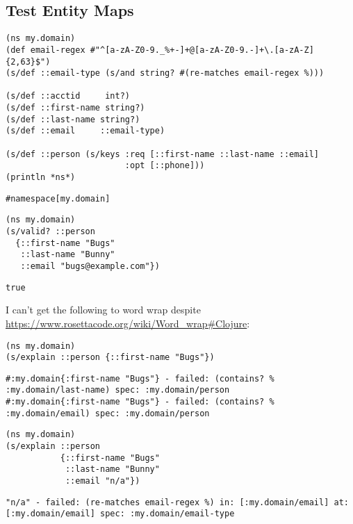 \documentclass[10pt,oneside,x11names]{article}
\begin{document}
\subsection{Test Entity Maps}
\label{sec:orgf1d3d4b}

\begin{verbatim}
(ns my.domain)
(def email-regex #"^[a-zA-Z0-9._%+-]+@[a-zA-Z0-9.-]+\.[a-zA-Z]{2,63}$")
(s/def ::email-type (s/and string? #(re-matches email-regex %)))

(s/def ::acctid     int?)
(s/def ::first-name string?)
(s/def ::last-name string?)
(s/def ::email     ::email-type)

(s/def ::person (s/keys :req [::first-name ::last-name ::email]
                        :opt [::phone]))
(println *ns*)
\end{verbatim}

\begin{verbatim}
#namespace[my.domain]
\end{verbatim}


\begin{verbatim}
(ns my.domain)
(s/valid? ::person
  {::first-name "Bugs"
   ::last-name "Bunny"
   ::email "bugs@example.com"})
\end{verbatim}

\begin{verbatim}
true
\end{verbatim}


I can't get the following to word wrap despite
\url{https://www.rosettacode.org/wiki/Word\_wrap\#Clojure}:

\begin{verbatim}
(ns my.domain)
(s/explain ::person {::first-name "Bugs"})
\end{verbatim}

\begin{verbatim}
#:my.domain{:first-name "Bugs"} - failed: (contains? % :my.domain/last-name) spec: :my.domain/person
#:my.domain{:first-name "Bugs"} - failed: (contains? % :my.domain/email) spec: :my.domain/person
\end{verbatim}


\begin{verbatim}
(ns my.domain)
(s/explain ::person
           {::first-name "Bugs"
            ::last-name "Bunny"
            ::email "n/a"})
\end{verbatim}

\begin{verbatim}
"n/a" - failed: (re-matches email-regex %) in: [:my.domain/email] at: [:my.domain/email] spec: :my.domain/email-type
\end{verbatim}
\end{document}

